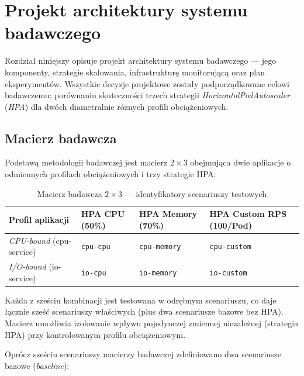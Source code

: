 \chapter{Projekt architektury systemu badawczego}

Rozdział niniejszy opisuje projekt architektury systemu badawczego — jego komponenty, strategie skalowania, infrastrukturę monitorującą oraz plan eksperymentów. Wszystkie decyzje projektowe zostały podporządkowane celowi badawczemu: porównaniu skuteczności trzech strategii \textit{HorizontalPodAutoscaler} (\textit{HPA}) dla dwóch diametralnie różnych profili obciążeniowych.

\section{Macierz badawcza}

Podstawą metodologii badawczej jest macierz $2 \times 3$ obejmująca dwie aplikacje o odmiennych profilach obciążeniowych i trzy strategie HPA:

\begin{table}[H]
  \centering
  \begin{tabularx}{\textwidth}{|l|X|X|X|}
    \hline
    \textbf{Profil aplikacji} & \textbf{HPA CPU (50\%)} & \textbf{HPA Memory (70\%)} & \textbf{HPA Custom RPS (100/Pod)} \\
    \hline
    \textit{CPU-bound} (cpu-service) & \texttt{cpu-cpu} & \texttt{cpu-memory} & \texttt{cpu-custom} \\
    \hline
    \textit{I/O-bound} (io-service) & \texttt{io-cpu} & \texttt{io-memory} & \texttt{io-custom} \\
    \hline
  \end{tabularx}
  \caption{Macierz badawcza $2 \times 3$ — identyfikatory scenariuszy testowych}
  \label{tab:research-matrix}
\end{table}

Każda z sześciu kombinacji jest testowana w odrębnym scenariuszu, co daje łącznie sześć scenariuszy właściwych (plus dwa scenariusze bazowe bez HPA). Macierz umożliwia izolowanie wpływu pojedynczej zmiennej niezależnej (strategia HPA) przy kontrolowanym profilu obciążeniowym.

Oprócz sześciu scenariuszy macierzy badawczej zdefiniowano dwa scenariusze bazowe (\textit{baseline}):


